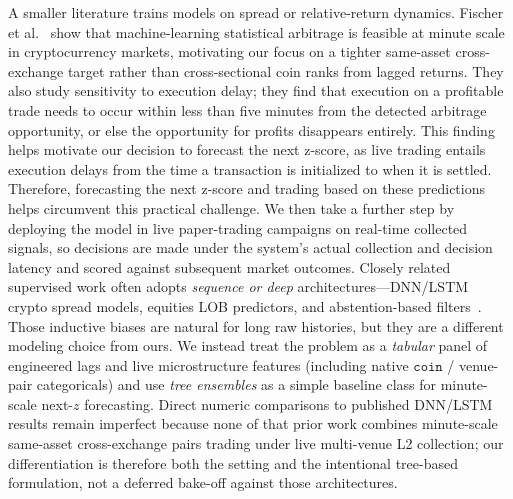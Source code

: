 A smaller literature trains models on spread or relative-return dynamics. Fischer et al.~\cite{fischer2019statistical} show that machine-learning statistical arbitrage is feasible at minute scale in cryptocurrency markets, motivating our focus on a tighter same-asset cross-exchange target rather than cross-sectional coin ranks from lagged returns. They also study sensitivity to execution delay; they find that execution on a profitable trade needs to occur within less than five minutes from the detected arbitrage opportunity, or else the opportunity for profits disappears entirely. This finding helps motivate our decision to forecast the next z-score, as live trading entails execution delays from the time a transaction is initialized to when it is settled. Therefore, forecasting the next z-score and trading based on these predictions helps circumvent this practical challenge. We then take a further step by deploying the model in live paper-trading campaigns on real-time collected signals, so decisions are made under the system's actual collection and decision latency and scored against subsequent market outcomes. Closely related supervised work often adopts \emph{sequence or deep} architectures---DNN/LSTM crypto spread models, equities LOB predictors, and abstention-based filters~\cite{tsoku2026dl, liou2024hft, han2024lstm, sarmento2024ml, shen2022arbitrage, perrone2026pairs}. Those inductive biases are natural for long raw histories, but they are a different modeling choice from ours. We instead treat the problem as a \emph{tabular} panel of engineered lags and live microstructure features (including native $\texttt{coin}$ / venue-pair categoricals) and use \emph{tree ensembles} as a simple baseline class for minute-scale next-$z$ forecasting. Direct numeric comparisons to published DNN/LSTM results remain imperfect because none of that prior work combines minute-scale same-asset cross-exchange pairs trading under live multi-venue L2 collection; our differentiation is therefore both the setting and the intentional tree-based formulation, not a deferred bake-off against those architectures.

